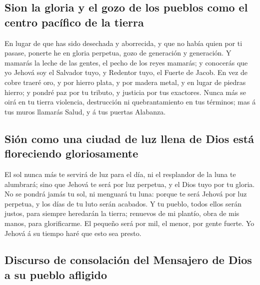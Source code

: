 \hypertarget{sion-la-gloria-y-el-gozo-de-los-pueblos-como-el-centro-pacuxedfico-de-la-tierra}{%
\subsection{Sion la gloria y el gozo de los pueblos como el centro
pacífico de la
tierra}\label{sion-la-gloria-y-el-gozo-de-los-pueblos-como-el-centro-pacuxedfico-de-la-tierra}}

 En lugar de que has sido desechada y aborrecida, y que
no había quien por ti pasase, ponerte he en gloria perpetua, gozo de
generación y generación.  Y mamarás la leche de las
gentes, el pecho de los reyes mamarás; y conocerás que yo Jehová soy el
Salvador tuyo, y Redentor tuyo, el Fuerte de Jacob.  En
vez de cobre traeré oro, y por hierro plata, y por madera metal, y en
lugar de piedras hierro; y pondré paz por tu tributo, y justicia por tus
exactores.  Nunca más se oirá en tu tierra violencia,
destrucción ni quebrantamiento en tus términos; mas á tus muros llamarás
Salud, y á tus puertas Alabanza.

\hypertarget{siuxf3n-como-una-ciudad-de-luz-llena-de-dios-estuxe1-floreciendo-gloriosamente}{%
\subsection{Sión como una ciudad de luz llena de Dios está floreciendo
gloriosamente}\label{siuxf3n-como-una-ciudad-de-luz-llena-de-dios-estuxe1-floreciendo-gloriosamente}}

 El sol nunca más te servirá de luz para el día, ni el
resplandor de la luna te alumbrará; sino que Jehová te será por luz
perpetua, y el Dios tuyo por tu gloria.  No se pondrá
jamás tu sol, ni menguará tu luna: porque te será Jehová por luz
perpetua, y los días de tu luto serán acabados.  Y tu
pueblo, todos ellos serán justos, para siempre heredarán la tierra;
renuevos de mi plantío, obra de mis manos, para glorificarme.
 El pequeño será por mil, el menor, por gente fuerte. Yo
Jehová á su tiempo haré que esto sea presto.

\hypertarget{discurso-de-consolaciuxf3n-del-mensajero-de-dios-a-su-pueblo-afligido}{%
\subsection{Discurso de consolación del Mensajero de Dios a su pueblo
afligido}\label{discurso-de-consolaciuxf3n-del-mensajero-de-dios-a-su-pueblo-afligido}}

